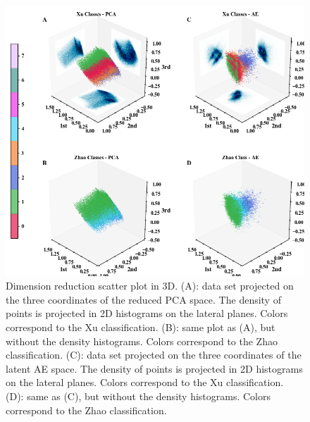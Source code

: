 \documentclass[utf8]{frontiersSCNS} %
\begin{document}
\begin{figure}[h!]
	\begin{center}
		\includegraphics[width=12cm]{dimreduc}%
	\end{center}
	\caption{Dimension reduction scatter plot in 3D. (A): data set projected on the three coordinates of the reduced PCA space. The density of points is projected in 2D histograms on the lateral planes. Colors correspond to the Xu classification. (B): same plot as (A), but without the density histograms. Colors correspond to the Zhao classification. (C): data set projected on the three coordinates of the latent AE space. The density of points is projected in 2D histograms on the lateral planes. Colors correspond to the Xu classification. (D): same as (C), but without the density histograms. Colors correspond to the Zhao classification. }\label{fig:dimreduc}
\end{figure}
\end{document}
